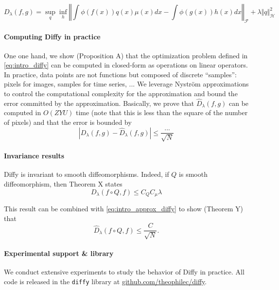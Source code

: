 \begin{equation}\label{eq:intro_diffy}
D_\lambda(f, g) = \sup_q \inf_h \left \Vert \int \phi(f(x))q(x)\mu(x)dx - \int\phi(g(x))h(x)dx\right \Vert_\mathcal F + \lambda \Vert q\Vert_\mathcal H^2
\end{equation}


\paragraph{Computing Diffy in practice}
One one hand, we show (Proposition A) that the optimization problem defined in \cref{eq:intro_diffy} can be computed in closed-form as operations on linear operators. In practice, data points are not functions but composed of discrete ``samples'': pixels for images, samples for time series, ... We leverage Nystr\"om approximations to control the computational complexity for the approximation and bound the error committed by the approximation. Basically, we prove that $\hat D_\lambda(f, g)$ can be computed in $O(ZYU)$ time (note that this is less than the square of the number of pixels) and that the error is bounded by
\begin{equation}\label{eq:intro_approx_diffy}
\left\vert D_\lambda(f, g) - \hat D_\lambda(f, g)\right\vert \leq \frac{...}{\sqrt{N}}
\end{equation}


\paragraph{Invariance results}
Diffy is invariant to smooth diffeomorphisms. Indeed, if $Q$ is smooth diffeomorphism, then Theorem X states
\begin{equation}
D_\lambda(f\circ Q, f) \leq C_QC_\mu\lambda
\end{equation}

This result can be combined with \cref{eq:intro_approx_diffy} to show (Theorem Y) that
\begin{equation}
\hat D_\lambda(f\circ Q, f) \leq \frac{C}{\sqrt{N}}.
\end{equation}

\paragraph{Experimental support \& library}

We conduct extensive experiments to study the behavior of Diffy in practice. All code is released in the \texttt{diffy} library at \url{github.com/theophilec/diffy}.

